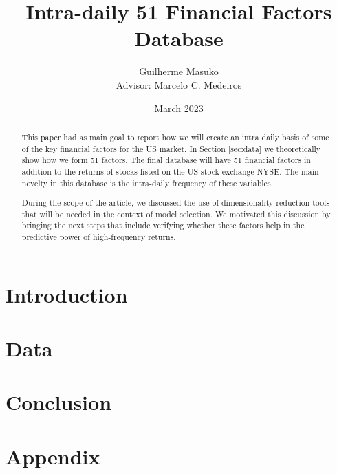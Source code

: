 \documentclass[12pt, a4paper]{article}
\title{Intra-daily 51 Financial Factors Database}
\author{Guilherme Masuko \\
Advisor: Marcelo C. Medeiros}
\date{March 2023}
\begin{document}
\begin{titlepage}
\clearpage
\maketitle
\thispagestyle{empty}
\begin{abstract}
	This paper had as main goal to report how we will create an intra daily basis of some of the key financial factors for the US market. In Section \ref{sec:data} we theoretically show how we form 51 factors. The final database will have 51 financial factors in addition to the returns of stocks listed on the US stock exchange NYSE. The main novelty in this database is the intra-daily frequency of these variables.
	
	During the scope of the article, we discussed the use of dimensionality reduction tools that will be needed in the context of model selection. We motivated this discussion by bringing the next steps that include verifying whether these factors help in the predictive power of high-frequency returns.
	
	
	
\end{abstract}
\end{titlepage}

	\section{Introduction} \label{sec:introduction}
	
	\section{Data} \label{sec:data}
	
	\section{Conclusion} \label{sec:conclusion}
	
	\newpage
	
	
	\newpage
	\appendix
	\section{Appendix} \label{sec:appendix}
	
\end{document}
